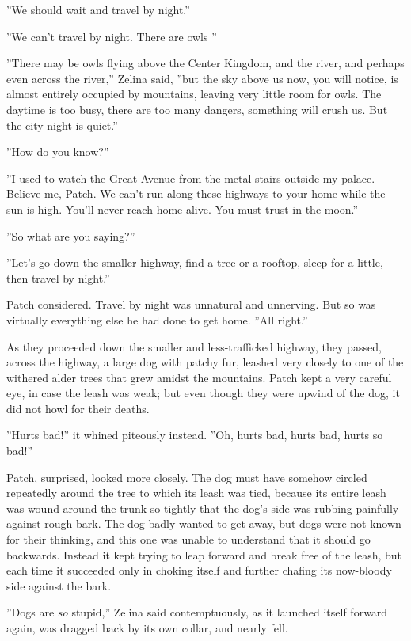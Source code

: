 \documentclass[12pt]{book}
\begin{document}
 ''We should wait and travel by night.''\par
 ''We can't travel by night. There are owls %
''\par
 ''There may be owls flying above the Center Kingdom, and the river, and perhaps even across the river,'' Zelina said, ''but the sky above us now, you will notice, is almost entirely occupied by mountains, leaving very little room for owls. The daytime is too busy, there are too many dangers, something will crush us. But the city night is quiet.''\par
 ''How do you know?''\par
 ''I used to watch the Great Avenue from the metal stairs outside my palace. Believe me, Patch. We can't run along these highways to your home while the sun is high. You'll never reach home alive. You must trust in the moon.''\par
 ''So what are you saying?''\par
 ''Let's go down the smaller highway, find a tree or a rooftop, sleep for a little, then travel by night.''\par
 Patch considered. Travel by night was unnatural and unnerving. But so was virtually everything else he had done to get home. ''All right.''\par
 As they proceeded down the smaller and less-trafficked highway, they passed, across the highway, a large dog with patchy fur, leashed very closely to one of the withered alder trees that grew amidst the mountains. Patch kept a very careful eye, in case the leash was weak; but even though they were upwind of the dog, it did not howl for their deaths.\par
 ''Hurts bad!'' it whined piteously instead. ''Oh, hurts bad, hurts bad, hurts so bad!''\par
 Patch, surprised, looked more closely. The dog must have somehow circled repeatedly around the tree to which its leash was tied, because its entire leash was wound around the trunk so tightly that the dog's side was rubbing painfully against rough bark. The dog badly wanted to get away, but dogs were not known for their thinking, and this one was unable to understand that it should go backwards. Instead it kept trying to leap forward and break free of the leash, but each time it succeeded only in choking itself and further chafing its now-bloody side against the bark.\par
 ''Dogs are {\it so} stupid,'' Zelina said contemptuously, as it launched itself forward again, was dragged back by its own collar, and nearly fell.\par
\end{document}
